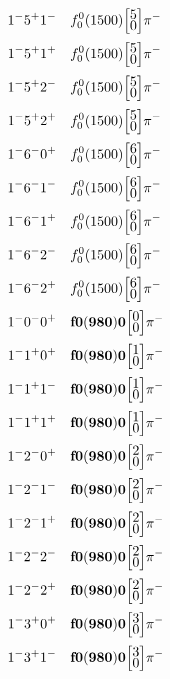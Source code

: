 \documentclass[10pt,a4paper]{article}
\def\dst{\displaystyle}
\def\vsp{\hbox{\vrule height12.5pt depth3.5pt width0pt}}
\def\ells#1#2{\Big[\hskip-5pt\vsp\begin{array}{c}\dst#1\\[-4pt]\dst#2\end{array}\vsp\hskip-5pt\Big]}
\begin{document}
\begin{align*} 
 \begin{aligned}
1^{-}5^{+}1^{-}\quad & f_0^0(1500)\ells{5}{0}\pi^-\\
1^{-}5^{+}1^{+}\quad & f_0^0(1500)\ells{5}{0}\pi^-\\
1^{-}5^{+}2^{-}\quad & f_0^0(1500)\ells{5}{0}\pi^-\\
1^{-}5^{+}2^{+}\quad & f_0^0(1500)\ells{5}{0}\pi^-\\
1^{-}6^{-}0^{+}\quad & f_0^0(1500)\ells{6}{0}\pi^-\\
1^{-}6^{-}1^{-}\quad & f_0^0(1500)\ells{6}{0}\pi^-\\
1^{-}6^{-}1^{+}\quad & f_0^0(1500)\ells{6}{0}\pi^-\\
1^{-}6^{-}2^{-}\quad & f_0^0(1500)\ells{6}{0}\pi^-\\
1^{-}6^{-}2^{+}\quad & f_0^0(1500)\ells{6}{0}\pi^-\\
1^{-}0^{-}0^{+}\quad & {\bf f0(980)0}\ells{0}{0}\pi^-\\
1^{-}1^{+}0^{+}\quad & {\bf f0(980)0}\ells{1}{0}\pi^-\\
1^{-}1^{+}1^{-}\quad & {\bf f0(980)0}\ells{1}{0}\pi^-\\
1^{-}1^{+}1^{+}\quad & {\bf f0(980)0}\ells{1}{0}\pi^-\\
1^{-}2^{-}0^{+}\quad & {\bf f0(980)0}\ells{2}{0}\pi^-\\
1^{-}2^{-}1^{-}\quad & {\bf f0(980)0}\ells{2}{0}\pi^-\\
1^{-}2^{-}1^{+}\quad & {\bf f0(980)0}\ells{2}{0}\pi^-\\
1^{-}2^{-}2^{-}\quad & {\bf f0(980)0}\ells{2}{0}\pi^-\\
1^{-}2^{-}2^{+}\quad & {\bf f0(980)0}\ells{2}{0}\pi^-\\
1^{-}3^{+}0^{+}\quad & {\bf f0(980)0}\ells{3}{0}\pi^-\\
1^{-}3^{+}1^{-}\quad & {\bf f0(980)0}\ells{3}{0}\pi^-\\
\end{aligned} 
 \end{align*}\pagebreak
\end{document}
